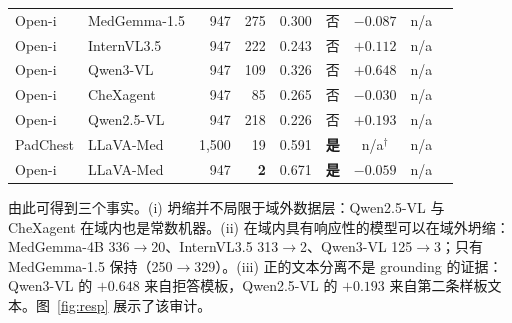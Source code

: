 \begin{table}[t]
\begin{tabular}{llrrrrcrr}
Open-i & MedGemma-1.5 & 947 & 275 & 0.300 & 否 & $-0.087$ & n/a \\
Open-i & InternVL3.5 & 947 & 222 & 0.243 & 否 & $+0.112$ & n/a \\
Open-i & Qwen3-VL & 947 & 109 & 0.326 & 否 & $+0.648$ & n/a \\
Open-i & CheXagent & 947 & 85 & 0.265 & 否 & $-0.030$ & n/a \\
Open-i & Qwen2.5-VL & 947 & 218 & 0.226 & 否 & $+0.193$ & n/a \\
\midrule
PadChest & LLaVA-Med & 1,500 & 19 & 0.591 & \textbf{是} & n/a$^{\dagger}$ & n/a \\
Open-i & LLaVA-Med & 947 & \textbf{2} & 0.671 & \textbf{是} & $-0.059$ & n/a \\
\bottomrule
\end{tabular}
\end{table}

由此可得到三个事实。(i) 坍缩并不局限于域外数据层：Qwen2.5-VL 与 CheXagent 在域内也是常数机器。(ii) 在域内具有响应性的模型可以在域外坍缩：MedGemma-4B 336$\rightarrow$20、InternVL3.5 313$\rightarrow$2、Qwen3-VL 125$\rightarrow$3；只有 MedGemma-1.5 保持（250$\rightarrow$329）。(iii) 正的文本分离不是 grounding 的证据：Qwen3-VL 的 $+0.648$ 来自拒答模板，Qwen2.5-VL 的 $+0.193$ 来自第二条样板文本。图~\ref{fig:resp} 展示了该审计。
